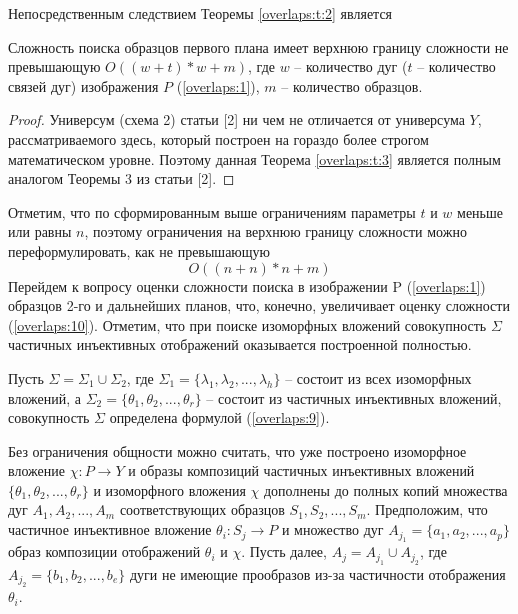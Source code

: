 Непосредственным следствием Теоремы \ref{overlaps:t:2} является

\begin{theorem}
Сложность поиска образцов первого плана имеет верхнюю границу сложности не превышающую  $O((w+t)*w+m)$,  где  $w$ -- количество дуг ($t$ -- количество связей дуг) изображения  $P$  (\ref{overlaps:1}), $m$ -- количество образцов.
\label{overlaps:t:3}
\end{theorem}
\begin{proof}
Универсум (схема 2) статьи [2] ни чем не отличается от универсума  $Y$, рассматриваемого здесь, который построен на гораздо более строгом математическом уровне. Поэтому данная Теорема \ref{overlaps:t:3}  является полным аналогом Теоремы 3 из статьи [2].
\end{proof}

Отметим, что по сформированным выше ограничениям параметры  $t$  и $w$  меньше или равны $n$,  поэтому  ограничения на верхнюю границу сложности можно переформулировать, как не превышающую  
\begin{equation}
O((n+n)*n+m)
\label{overlaps:10}
\end{equation}
Перейдем к вопросу оценки сложности поиска в  изображении  P  (\ref{overlaps:1})  образцов 2-го и дальнейших планов, что, конечно, увеличивает оценку сложности (\ref{overlaps:10}).  Отметим, что при поиске изоморфных вложений совокупность $\Sigma$ частичных инъективных отображений  оказывается построенной полностью.

Пусть $\Sigma = \Sigma_1 \cup \Sigma_2$, где $\Sigma_1  =  \{\lambda_1, \lambda_2 ,... , \lambda_h \}$ -- состоит из всех изоморфных вложений,  а  $\Sigma_2  =  \{\theta_1, \theta_2 ,..., \theta_r\}$ -- состоит из частичных инъективных вложений, совокупность  $\Sigma$  определена формулой (\ref{overlaps:9}).  

Без ограничения общности можно считать, что уже построено изоморфное вложение  $\chi : P \to Y$  и образы композиций частичных инъективных вложений $\{\theta_1, \theta_2 ,..., \theta_r\}$ и изоморфного вложения $\chi$  дополнены до полных копий множества дуг  $A_1, A_2, ..., A_m$ соответствующих образцов  $S_1, S_2, ..., S_m$.  Предположим,  что частичное инъективное вложение  $\theta_i :  S_j \to P$  и  множество дуг  $A_{j_1} = \{ a_1, a_2 ,... , a_p\}$  образ композиции отображений  $\theta_i$  и $\chi$.  Пусть далее,  $A_j  =  A_{j_1} \cup A_{j_2}$, где  $A_{j_2}  =  \{ b_1, b_2 ,..., b_e\}$ дуги не имеющие прообразов из-за частичности отображения  $\theta_i$. 


